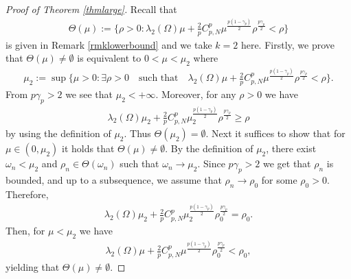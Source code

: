 \documentclass[10pt,a4paper]{article}
\theoremstyle{definition} \theoremstyle{remark}
\numberwithin{equation}{section}
\newcommand{\la}{\lambda}
\newcommand{\ga}{\gamma}
\begin{document}
\begin{proof}[Proof of Theorem \ref{thmlarge}]
	Recall that
	\begin{align*}
		\Theta(\mu) := \bigl\{\rho > 0: \la_2(\Omega)\mu + \frac2p C_{p,N}^p \mu^{\frac{p(1-\ga_p)}{2}}\rho ^{\frac{p\ga_p}{2}} < \rho\bigr\}
	\end{align*}
	is given in Remark \ref{rmklowerbound} and we take $k =2$ here. Firstly, we prove that $\Theta(\mu) \neq \emptyset$ is equivalent to $0 < \mu < \mu_2$ where
	\begin{align} \label{eqmu2}
		\mu_2 := \sup \bigl\{\mu > 0: \exists \rho > 0 \quad \text{such that} \quad \la_2(\Omega)\mu + \frac2p C_{p,N}^p \mu^{\frac{p(1-\ga_p)}{2}}\rho ^{\frac{p\ga_p}{2}} < \rho\bigr\}.
	\end{align}
	From $p\ga_p > 2$ we see that $\mu_2 < +\infty$. Moreover, for any $\rho >0$ we have
	\begin{align*}
		\la_2(\Omega)\mu_2 + \frac2p C_{p,N}^p \mu_2^{\frac{p(1-\ga_p)}{2}}\rho ^{\frac{p\ga_p}{2}} \geq \rho
	\end{align*}
	by using the definition of $\mu_2$. Thus $\Theta(\mu_2) = \emptyset$. Next it suffices to show that for $\mu \in (0,\mu_2)$ it holds that $\Theta(\mu) \neq \emptyset$. By the definition of $\mu_2$, there exist $\omega_n < \mu_2$ and $\rho_n \in \Theta(\omega_n)$ such that $\omega_n \to \mu_2$. Since $p\ga_p > 2$ we get that $\rho_n$ is bounded, and up to a subsequence, we assume that $\rho_n \to \rho_0$ for some $\rho_0 > 0$. Therefore,
	\begin{align*}
		\la_2(\Omega)\mu_2 + \frac2p C_{p,N}^p \mu_2^{\frac{p(1-\ga_p)}{2}}\rho_0 ^{\frac{p\ga_p}{2}} = \rho_0.
	\end{align*}
	Then, for $\mu < \mu_2$ we have
	\begin{align*}
		\la_2(\Omega)\mu + \frac2p C_{p,N}^p \mu^{\frac{p(1-\ga_p)}{2}}\rho_0 ^{\frac{p\ga_p}{2}} < \rho_0,
	\end{align*}
	yielding that $\Theta(\mu) \neq \emptyset$.


\end{proof}
\end{document}
